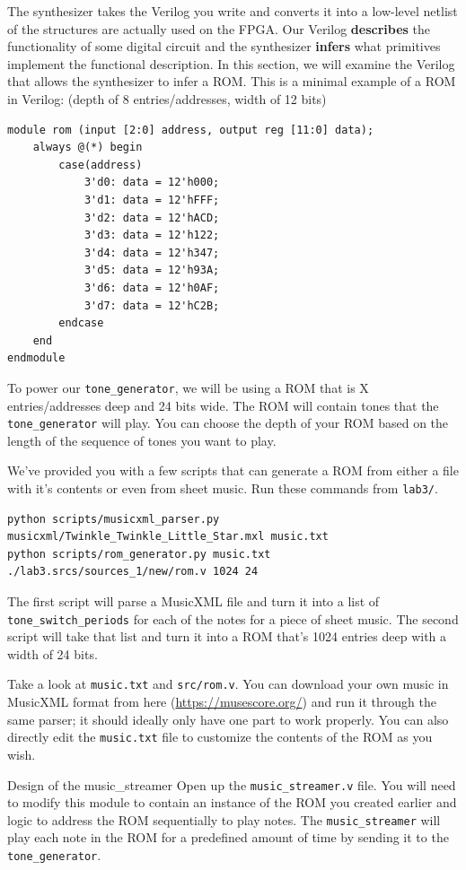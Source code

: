\documentclass[11pt]{article}
\makeatletter
\renewcommand{\section}
{\@startsection {section}{1}{0pt}
 {-2ex}
 {1ex}
 {\bfseries\Large}}
\makeatother
\begin{document}
The synthesizer takes the Verilog you write and converts it into a low-level netlist of the structures are actually used on the FPGA. Our Verilog \textbf{describes} the functionality of some digital circuit and the synthesizer \textbf{infers} what primitives implement the functional description. In this section, we will examine the Verilog that allows the synthesizer to infer a ROM. This is a minimal example of a ROM in Verilog: (depth of 8 entries/addresses, width of 12 bits)

\begin{verbatim}
module rom (input [2:0] address, output reg [11:0] data);
	always @(*) begin
		case(address)
			3'd0: data = 12'h000;
			3'd1: data = 12'hFFF;
			3'd2: data = 12'hACD;
			3'd3: data = 12'h122;
			3'd4: data = 12'h347;
			3'd5: data = 12'h93A;
			3'd6: data = 12'h0AF;
			3'd7: data = 12'hC2B;
		endcase
	end
endmodule
\end{verbatim}

To power our \verb|tone_generator|, we will be using a ROM that is X entries/addresses deep and 24 bits wide. The ROM will contain tones that the \verb|tone_generator| will play. You can choose the depth of your ROM based on the length of the sequence of tones you want to play.

We've provided you with a few scripts that can generate a ROM from either a file with it's contents or even from sheet music. Run these commands from \verb|lab3/|.

\begin{verbatim}
python scripts/musicxml_parser.py musicxml/Twinkle_Twinkle_Little_Star.mxl music.txt
python scripts/rom_generator.py music.txt ./lab3.srcs/sources_1/new/rom.v 1024 24
\end{verbatim}

The first script will parse a MusicXML file and turn it into a list of \verb|tone_switch_periods| for each of the notes for a piece of sheet music. The second script will take that list and turn it into a ROM that's 1024 entries deep with a width of 24 bits.

Take a look at \verb|music.txt| and \verb|src/rom.v|. You can download your own music in MusicXML format from here (\url{https://musescore.org/}) and run it through the same parser; it should ideally only have one part to work properly. You can also directly edit the \verb|music.txt| file to customize the contents of the ROM as you wish.

\section{Design of the music\_streamer}
Open up the \verb|music_streamer.v| file. You will need to modify this module to contain an instance of the ROM you created earlier and logic to address the ROM sequentially to play notes. The \verb|music_streamer| will play each note in the ROM for a predefined amount of time by sending it to the \verb|tone_generator|.
\end{document}
